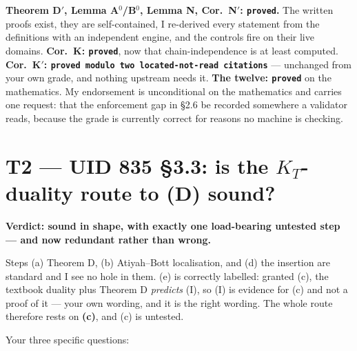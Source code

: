 \documentclass[11pt,a4paper]{article}
\begin{document}
\textbf{Theorem D$'$, Lemma A$^0$/B$^0$, Lemma N, Cor.\ N$'$: \texttt{proved}.} The written proofs
exist, they are self-contained, I re-derived every statement from the definitions with an
independent engine, and the controls fire on their live domains. \textbf{Cor.\ K: \texttt{proved}},
now that chain-independence is at least computed. \textbf{Cor.\ K$'$: \texttt{proved modulo two
located-not-read citations}} --- unchanged from your own grade, and nothing upstream needs it.
\textbf{The twelve: \texttt{proved}} on the mathematics. My endorsement is unconditional on the
mathematics and carries one request: that the enforcement gap in \S2.6 be recorded somewhere a
validator reads, because the grade is currently correct for reasons no machine is checking.

\section{T2 --- UID 835 \S3.3: is the $K_T$-duality route to (D) sound?}

\textbf{Verdict: sound in shape, with exactly one load-bearing untested step --- and now redundant
rather than wrong.}

Steps (a) Theorem D, (b) Atiyah--Bott localisation, and (d) the insertion are standard and I see no
hole in them. (e) is correctly labelled: granted (c), the textbook duality plus Theorem D
\emph{predicts} (I), so (I) is evidence for (c) and not a proof of it --- your own wording, and it
is the right wording. The whole route therefore rests on \textbf{(c)}, and (c) is untested.

Your three specific questions:
\end{document}
